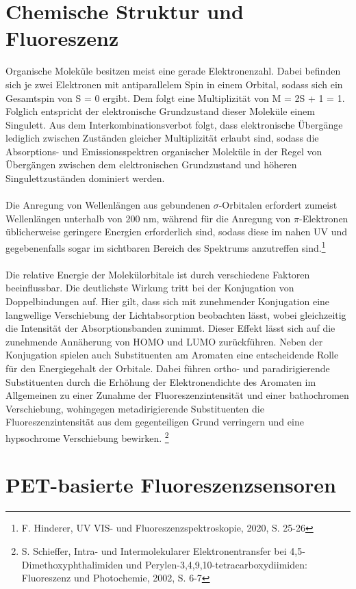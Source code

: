 \documentclass[12pt,a4paper]{report}
\begin{document}
	\section{Chemische Struktur und Fluoreszenz}
	Organische Moleküle besitzen meist eine gerade Elektronenzahl. Dabei befinden sich je zwei Elektronen mit antiparallelem Spin in einem Orbital, sodass sich ein Gesamtspin von S = 0 ergibt. Dem folgt eine Multiplizität  von M = 2S + 1 = 1. Folglich entspricht der elektronische Grundzustand dieser Moleküle einem Singulett. Aus dem Interkombinationsverbot folgt, dass elektronische Übergänge lediglich zwischen Zuständen gleicher Multiplizität erlaubt sind, sodass die Absorptions- und Emissionsspektren organischer Moleküle in der Regel von Übergängen zwischen dem elektronischen Grundzustand  und höheren Singulettzuständen  dominiert werden.\\
	\ \\
	Die Anregung von Wellenlängen aus gebundenen $\sigma$-Orbitalen erfordert zumeist Wellenlängen unterhalb von 200 nm, während für die Anregung von $\pi$-Elektronen üblicherweise geringere Energien erforderlich sind, sodass diese im nahen UV und gegebenenfalls sogar im sichtbaren Bereich des Spektrums anzutreffen sind.\footnote{F. Hinderer, UV VIS- und Fluoreszenzspektroskopie, 2020, S. 25-26}\\
	\ \\  
	Die relative Energie der Molekülorbitale ist durch verschiedene Faktoren beeinflussbar. Die deutlichste Wirkung tritt bei der Konjugation von Doppelbindungen auf. Hier gilt, dass sich mit zunehmender Konjugation eine langwellige Verschiebung der Lichtabsorption beobachten lässt, wobei gleichzeitig die Intensität der Absorptionsbanden zunimmt. Dieser Effekt lässt sich auf die zunehmende Annäherung von HOMO und LUMO zurückführen. Neben der Konjugation spielen auch Substituenten am Aromaten eine entscheidende Rolle für den Energiegehalt der Orbitale. Dabei führen ortho- und paradirigierende Substituenten durch die Erhöhung der Elektronendichte des Aromaten im Allgemeinen zu einer Zunahme der Fluoreszenzintensität und einer bathochromen Verschiebung, wohingegen metadirigierende Substituenten die Fluoreszenzintensität aus dem gegenteiligen Grund verringern und eine hypsochrome Verschiebung bewirken. \footnote{S. Schieffer, Intra- und Intermolekularer Elektronentransfer bei 4,5-Dimethoxyphthalimiden und Perylen-3,4,9,10-tetracarboxydiimiden: Fluoreszenz und Photochemie, 2002, S. 6-7}
	\section{PET-basierte Fluoreszenzsensoren}
\end{document}
